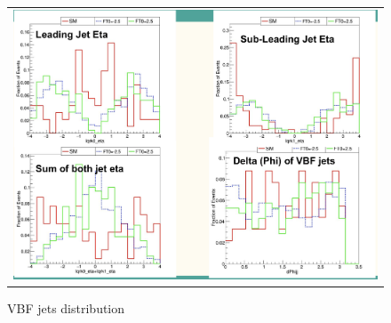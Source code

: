 \begin{figure}[htb]
  \begin{center}
    \begin{tabular}{c}
    \includegraphics[width=1.00\textwidth]{Plots/GenLevelStudy/pic1.png}    \end{tabular}
    \caption{VBF jets distribution}
    \label{fig:gen1}
  \end{center}
\end{figure}
